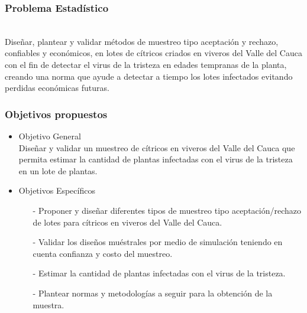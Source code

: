 \documentclass[12pt]{beamer}
\begin{document}
\begin{frame}
\frametitle{Problema Estadístico}
~\\Diseñar, plantear y validar métodos de muestreo tipo aceptación y rechazo, confiables y económicos, en lotes de cítricos criados en viveros del Valle del Cauca con el fin de detectar el virus de la tristeza en edades tempranas de la planta, creando una norma que ayude a detectar a tiempo los lotes infectados evitando perdidas económicas futuras.
\end{frame}

\begin{frame}
\frametitle{Objetivos propuestos}
\begin{itemize}
\item Objetivo General
~\\Diseñar y validar un muestreo de cítricos en viveros del Valle del Cauca que permita estimar la cantidad de plantas infectadas con el virus de la tristeza en un lote de plantas.
\item Objetivos Específicos
\begin{itemize}
\item[-]Proponer y diseñar diferentes tipos de muestreo tipo aceptación/rechazo de lotes para cítricos en viveros del Valle del Cauca.
\item[-]Validar los diseños muéstrales por medio de simulación teniendo en cuenta confianza y costo del muestreo.
\item[-]Estimar la cantidad de plantas infectadas con el virus de la tristeza.
\item[-]Plantear normas y metodologías a seguir para la obtención de la muestra.
\end{itemize}
\end{itemize}
\end{frame}
\end{document}
